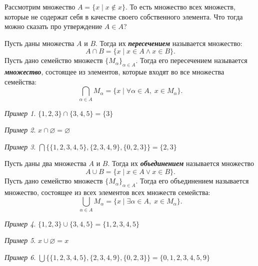 \documentclass{article}
\theoremstyle{remark}
\newtheorem{example}{Пример}
\begin{document}
\begin{paradox}[ (Рассел)]
	Рассмотрим множество $A = \{x\mid x \notin x\}$. То есть множество всех множеств, которые не содержат себя в качестве своего собственного элемента. Что тогда можно сказать про утверждение $A \in A$?
\end{paradox}

\begin{definition}
	Пусть даны множества $A$ и $B$. Тогда их \textit{\textbf{пересечением}} называется множество: $$A \cap B = \{x \mid x\in A \wedge x \in B\}.$$
	Пусть дано семейство множеств $\{M_{\alpha}\}_{\alpha \in A}.$ Тогда его пересечением называется \textbf{\textit{множество}}, состоящее из элементов, которые входят во все множества семейства: $$\bigcap\limits_{\alpha \in A} M_{\alpha} = \{x \mid \forall \alpha \in A,\; x \in M_{\alpha}\}.$$
\end{definition}

\begin{example}
	$\{1,2,3\}\cap \{3,4,5\} = \{3\}$
\end{example}

\begin{example}
	$x \cap \varnothing = \varnothing$
\end{example}

\begin{example}
	$\bigcap \{\{1,2,3,4,5\}, \{2,3,4,9\}, \{0,2,3\}\} = \{2,3\}$
\end{example}

\begin{definition}
	Пусть даны два множества $A$ и $B$. Тогда их \textbf{\textit{объединением}} называется множество	
	$$A \cup B = \{ x \mid x\in A \vee x\in B\}.$$
	Пусть дано семейство множеств $\{M_{\alpha}\}_{\alpha \in A}.$ Тогда его объединением называется множество, состоящее из всех элементов всех множеств семейства: $$\bigcup\limits_{\alpha \in A} M_{\alpha} = \{x \mid \exists \alpha \in A,\; x \in M_{\alpha}\}.$$
\end{definition}

\begin{example}
	$\{1,2,3\}\cup \{3,4,5\} = \{1,2,3,4,5\}$
\end{example}

\begin{example}
	$x \cup \varnothing = x$
\end{example}

\begin{example}
	$\bigcup \{\{1,2,3,4,5\}, \{2,3,4,9\}, \{0,2,3\}\} = \{0,1,2,3,4,5,9\}$
\end{example}
\end{document}
